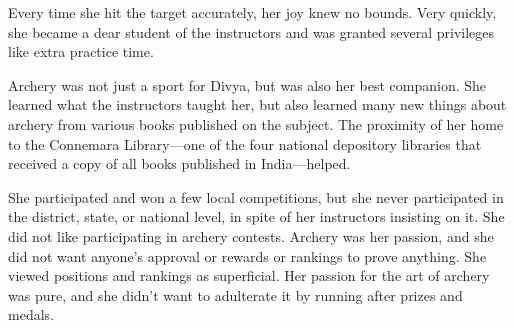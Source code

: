 Every time she hit the target accurately, her joy knew no bounds. Very quickly, she
became a dear student of the instructors and was granted several privileges
like extra practice time.

Archery was not just a sport for Divya, but was also her best
companion. She learned what the instructors taught her, but also learned many
new things about archery from various books published on the subject. The
proximity of her home to the Connemara Library—one of the four national
depository libraries that received a copy of all books published in India—helped.

She participated and won a few local competitions, but she never participated in the
district, state, or national level, in spite of her
instructors insisting on it. She did not like participating in archery contests.
Archery was her passion, and she did not want anyone's approval or rewards or
rankings to prove anything. She viewed positions and rankings as superficial. Her
passion for the art of archery was pure, and she didn't want to
adulterate it by running after prizes and medals.